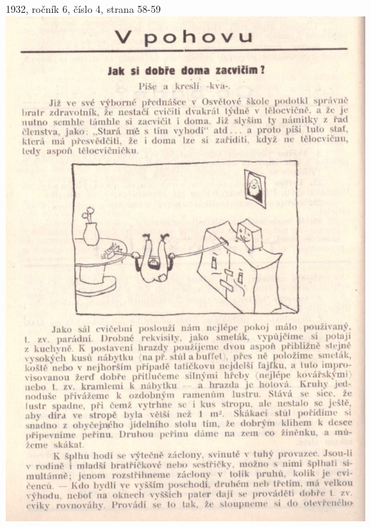 \documentclass[11pt]{article}
\begin{document}
1932, ročník 6, číslo 4, strana 58-59 \\
\includegraphics[width=\imagewidth]{original/1932/Skener_20250320 (7).jpg}
\end{document}
